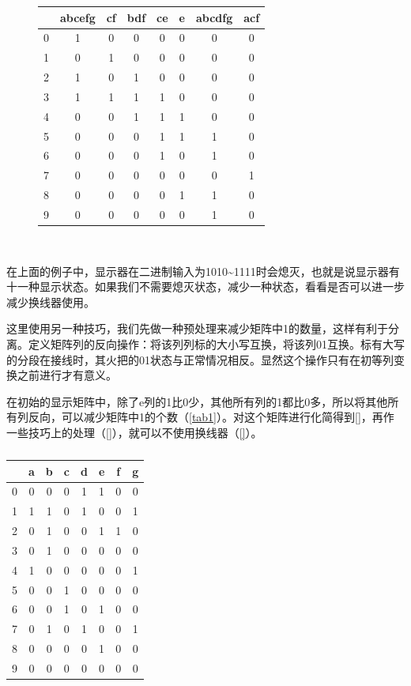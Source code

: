 \begin{figure}[p]
{\begin{tabular}{|c|ccccccc|}
&abcefg&cf&bdf&ce&e&abcdfg&acf\\\hline
0&1&0&0&0&0&0&0\\
1&0&1&0&0&0&0&0\\
2&1&0&1&0&0&0&0\\
3&1&1&1&1&0&0&0\\
4&0&0&1&1&1&0&0\\
5&0&0&0&1&1&1&0\\
6&0&0&0&1&0&1&0\\
7&0&0&0&0&0&0&1\\
8&0&0&0&0&1&1&0\\
9&0&0&0&0&0&1&0
\end{tabular}
}\\
\caption{}
\label{bianhuanp2}
\end{figure}

在上面的例子中，显示器在二进制输入为1010\~{}1111时会熄灭，也就是说显示器有十一种显示状态。如果我们不需要熄灭状态，减少一种状态，看看是否可以进一步减少换线器使用。

这里使用另一种技巧，我们先做一种预处理来减少矩阵中1的数量，这样有利于分离。定义矩阵列的反向操作：将该列列标的大小写互换，将该列01互换。标有大写的分段在接线时，其火把的01状态与正常情况相反。显然这个操作只有在初等列变换之前进行才有意义。

在初始的显示矩阵中，除了e列的1比0少，其他所有列的1都比0多，所以将其他所有列反向，可以减少矩阵中1的个数（\autoref{tab1}）。对这个矩阵进行化简得到\autoref{}，再作一些技巧上的处理（\autoref{}），就可以不使用换线器（\autoref{}）。

\begin{table}[!h]
\centering
\begin{tabular}{c|ccccccc}
&a&b&c&d&e&f&g\\\hline
0&0&0&0&1&1&0&0\\
1&1&1&0&1&0&0&1\\
2&0&1&0&0&1&1&0\\
3&0&1&0&0&0&0&0\\
4&1&0&0&0&0&0&1\\
5&0&0&1&0&0&0&0\\
6&0&0&1&0&1&0&0\\
7&0&1&0&1&0&0&1\\
8&0&0&0&0&1&0&0\\
9&0&0&0&0&0&0&0
\end{tabular}
\caption{}\label{tab1}
\end{table}

